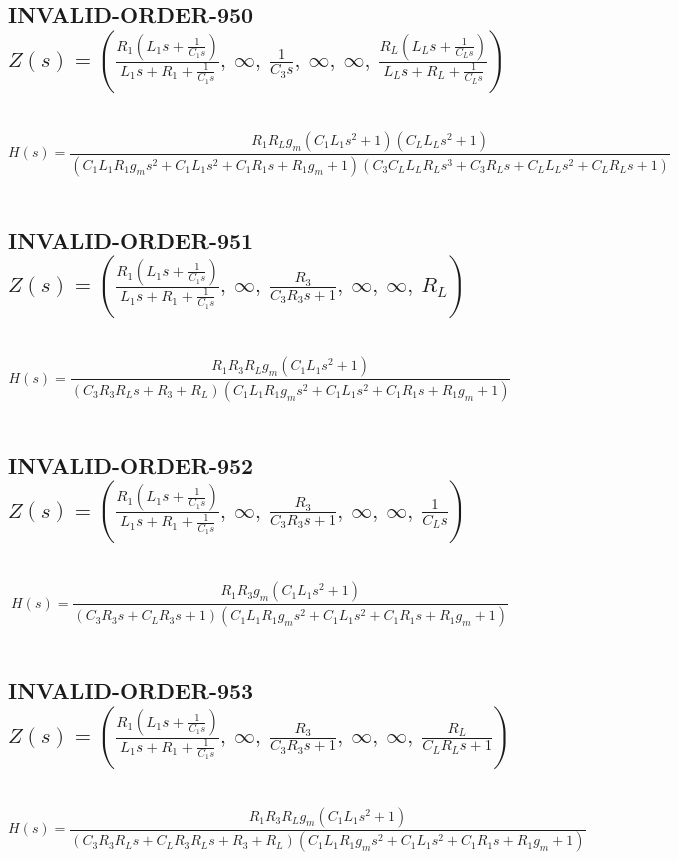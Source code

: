 \documentclass{article}
\begin{document}
\subsection{INVALID-ORDER-950 $Z(s) = \left( \frac{R_{1} \left(L_{1} s + \frac{1}{C_{1} s}\right)}{L_{1} s + R_{1} + \frac{1}{C_{1} s}}, \  \infty, \  \frac{1}{C_{3} s}, \  \infty, \  \infty, \  \frac{R_{L} \left(L_{L} s + \frac{1}{C_{L} s}\right)}{L_{L} s + R_{L} + \frac{1}{C_{L} s}}\right)$ } \ 
\textbf{\[H(s) = \frac{R_{1} R_{L} g_{m} \left(C_{1} L_{1} s^{2} + 1\right) \left(C_{L} L_{L} s^{2} + 1\right)}{\left(C_{1} L_{1} R_{1} g_{m} s^{2} + C_{1} L_{1} s^{2} + C_{1} R_{1} s + R_{1} g_{m} + 1\right) \left(C_{3} C_{L} L_{L} R_{L} s^{3} + C_{3} R_{L} s + C_{L} L_{L} s^{2} + C_{L} R_{L} s + 1\right)}\] } \ 
\subsection{INVALID-ORDER-951 $Z(s) = \left( \frac{R_{1} \left(L_{1} s + \frac{1}{C_{1} s}\right)}{L_{1} s + R_{1} + \frac{1}{C_{1} s}}, \  \infty, \  \frac{R_{3}}{C_{3} R_{3} s + 1}, \  \infty, \  \infty, \  R_{L}\right)$ } \ 
\textbf{\[H(s) = \frac{R_{1} R_{3} R_{L} g_{m} \left(C_{1} L_{1} s^{2} + 1\right)}{\left(C_{3} R_{3} R_{L} s + R_{3} + R_{L}\right) \left(C_{1} L_{1} R_{1} g_{m} s^{2} + C_{1} L_{1} s^{2} + C_{1} R_{1} s + R_{1} g_{m} + 1\right)}\] } \ 
\subsection{INVALID-ORDER-952 $Z(s) = \left( \frac{R_{1} \left(L_{1} s + \frac{1}{C_{1} s}\right)}{L_{1} s + R_{1} + \frac{1}{C_{1} s}}, \  \infty, \  \frac{R_{3}}{C_{3} R_{3} s + 1}, \  \infty, \  \infty, \  \frac{1}{C_{L} s}\right)$ } \ 
\textbf{\[H(s) = \frac{R_{1} R_{3} g_{m} \left(C_{1} L_{1} s^{2} + 1\right)}{\left(C_{3} R_{3} s + C_{L} R_{3} s + 1\right) \left(C_{1} L_{1} R_{1} g_{m} s^{2} + C_{1} L_{1} s^{2} + C_{1} R_{1} s + R_{1} g_{m} + 1\right)}\] } \ 
\subsection{INVALID-ORDER-953 $Z(s) = \left( \frac{R_{1} \left(L_{1} s + \frac{1}{C_{1} s}\right)}{L_{1} s + R_{1} + \frac{1}{C_{1} s}}, \  \infty, \  \frac{R_{3}}{C_{3} R_{3} s + 1}, \  \infty, \  \infty, \  \frac{R_{L}}{C_{L} R_{L} s + 1}\right)$ } \ 
\textbf{\[H(s) = \frac{R_{1} R_{3} R_{L} g_{m} \left(C_{1} L_{1} s^{2} + 1\right)}{\left(C_{3} R_{3} R_{L} s + C_{L} R_{3} R_{L} s + R_{3} + R_{L}\right) \left(C_{1} L_{1} R_{1} g_{m} s^{2} + C_{1} L_{1} s^{2} + C_{1} R_{1} s + R_{1} g_{m} + 1\right)}\] } \ 
\end{document}

